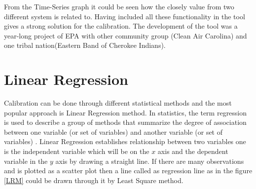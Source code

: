From the Time-Series graph it could be seen how the closely value from two different system is related to.
Having included all these functionality in the tool gives a strong solution for the calibration. The development of the tool was a year-long project of EPA with other community group (Clean Air
Carolina) and  one tribal nation(Eastern Band of Cherokee Indians).













\section{Linear Regression}

Calibration can be done through different statistical methods and the most popular approach is Linear Regression method. In statistics, the term regression is used to describe a group of methods that summarize the degree of association between one variable (or set of variables) and another variable (or set of variables) \cite{Burke}. Linear Regression establishes relationship between two variables one is the independent variable which will be on the $x$ axis and the dependent variable in the $y$ axis by drawing a straight line.
If there are many observations and is plotted as a scatter plot then a line called as regression line as in the figure \ref{LRM} could be drawn through it by Least Square method. 


